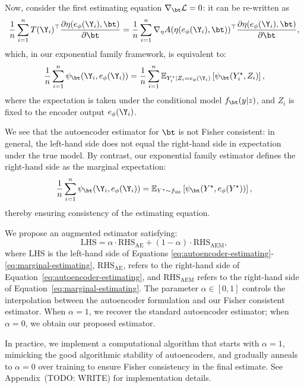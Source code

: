 Now, consider the first estimating equation \( \nabla_\bt \mathcal{L} = 0 \): it can be re-written as
\[
\frac{1}{n} \sum_{i=1}^n 
T(\Y_i)^\top 
\frac{\partial \eta(e_\phi(\Y_i), \bt)}{\partial \bt}
=
\frac{1}{n} \sum_{i=1}^n 
\nabla_\eta A(\eta(e_\phi(\Y_i), \bt))^\top 
\frac{\partial \eta(e_\phi(\Y_i), \bt)}{\partial \bt},
\]
which, in our exponential family framework, is equivalent to:
\begin{equation}
\label{eq:autoencoder-estimating}
\frac{1}{n} \sum_{i=1}^n \psi_\bt(\Y_i, e_\phi(\Y_i)) 
=
\frac{1}{n} \sum_{i=1}^n 
\mathbb{E}_{Y_i^\star \mid Z_i = e_\phi(\Y_i)} 
\left[ \psi_\bt(Y_i^\star, Z_i) \right],
\end{equation}
where the expectation is taken under the conditional model \( f_\bt(y | z) \), and \( Z_i \) is fixed to the encoder output \( e_\phi(\Y_i) \).

We see that the autoencoder estimator for \( \bt \) is not Fisher consistent: in general, the left-hand side does not equal the right-hand side in expectation under the true model. By contrast, our exponential family estimator defines the right-hand side as the marginal expectation:
\begin{equation}
\label{eq:marginal-estimating}
\frac{1}{n} \sum_{i=1}^n \psi_\bt(\Y_i, e_\phi(\Y_i)) 
=
\mathbb{E}_{Y^\star \sim f_\bt} 
\left[ \psi_\bt(Y^\star, e_\phi(Y^\star)) \right],
\end{equation}
thereby ensuring consistency of the estimating equation.

We propose an augmented estimator satisfying:
\[
\text{LHS} 
= \alpha \cdot \text{RHS}_{\text{AE}} 
+ (1 - \alpha) \cdot \text{RHS}_{\text{AEM}},
\]
where  \( \text{LHS} \) is the left-hand side of Equations \eqref{eq:autoencoder-estimating}-\eqref{eq:marginal-estimating},  \( \text{RHS}_{\text{AE}} \), refers to the right-hand side of Equation~\eqref{eq:autoencoder-estimating}, and \( \text{RHS}_{\text{AEM}} \) refers to the right-hand side of Equation~\eqref{eq:marginal-estimating}. The parameter \( \alpha \in [0, 1] \) controls the interpolation between the autoencoder formulation and our Fisher consistent estimator. When \( \alpha = 1 \), we recover the standard autoencoder estimator; when \( \alpha = 0 \), we obtain our proposed estimator.

In practice, we implement a computational algorithm that starts with \( \alpha = 1 \), mimicking the good algorithmic stability of autoencoders, and gradually anneals to \( \alpha = 0 \) over training to ensure Fisher consistency in the final estimate. See Appendix~(TODO: WRITE) for implementation details.

